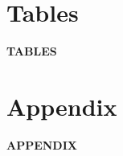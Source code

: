\documentclass[11pt, a4paper]{article} %
\begin{document}
\newpage
\TODO\section{Tables}
\vspace*{\fill}
{\Huge \begin{center}\textbf{TABLES}\end{center}}
\vspace*{\fill}\clearpage









\newpage
\TODO\section{Appendix}
\vspace*{\fill}
{\Huge \begin{center}\textbf{APPENDIX}\end{center}}
\vspace*{\fill}\clearpage


\renewcommand\thefigure{A\arabic{figure}}
\setcounter{figure}{0} 
\captionsetup[subfigure]{labelformat=parens}
\end{document}
